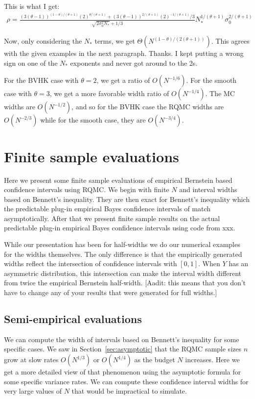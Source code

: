 \documentclass{article}
\newcommand{\art}[1]{\begingroup\color{blue}#1\endgroup}
\newcommand{\aadit}[1]{\begingroup\color{orange}#1\endgroup}
\begin{document}
\aadit{This is what I get: \begin{align*}
\rho=\frac{({3(\theta-1)})^{(1-\theta)/(\theta+1)}(2)^{\theta/(\theta + 1)}
+(3(\theta-1))^{2/(\theta+1)}(2)^{-1/(\theta + 1)}/3}
{\sqrt{{2\sigma^2_0N_*}}+1/3}N_*^{1/(\theta+1)}\sigma_0^{2/(\theta+1)}
\end{align*}

Now, only considering the $N_*$ terms, we get $\Theta(N^{(1 - \theta)/(2(\theta + 1))})$. This agrees with the given examples in the next paragraph.}
\art{Thanks.  I kept putting a wrong sign on one of the $N_*$ exponents and never got around to the 2s.}


For the BVHK case with $\theta=2$, 
we get a ratio of $O(N^{-1/6})$.
For the smooth case with $\theta=3$,
we get a more favorable width ratio of $O(N^{-1/4})$.
The MC widths are $O(N^{-1/2})$, and so for the
BVHK case the RQMC widths are $O(N^{-2/3})$
while for the smooth case, they are $O(N^{-3/4})$.


\section{Finite sample evaluations}\label{sec:finite}

Here we present some finite sample evaluations
of empirical Bernstein based confidence intervals
using RQMC.  We begin with finite $N$ and interval
widths based on Bennett's inequality.  They are
then exact for Bennett's inequality which the
predictable plug-in empirical Bayes confidence intervals
of \cite{WauRam24a} match asymptotically.
After that we present finite sample results on the
actual predictable plug-in empirical Bayes confidence
intervals using code from \art{xxx}.

While our presentation has been for half-widths
we do our numerical examples for the widths
themselves.  The only difference is that the
empirically generated widths reflect the intersection
of confidence intervals with $[0,1]$.  When $Y$ has
an asymmetric distribution, this intersection can
make the interval width different from twice the
empirical Bernstein half-width.
\art{[Aadit: this means that you don't have to change any
of your results that were generated for full widths.]}

\subsection{Semi-empirical evaluations}

We can compute the width of intervals based on Bennett's inequality
for some specific cases.  We saw in Section~\ref{sec:asymptotic}
that the RQMC sample sizes $n$ grow at slow rates
$O(N^{1/3})$ or $O(N^{1/4})$ as the budget $N$ increases.
Here we get a more detailed view of that phenomenon using
the asymptotic formula for some specific variance rates.
We can compute these confidence interval widths for very
large values of $N$ that would be impractical to simulate.
\end{document}
